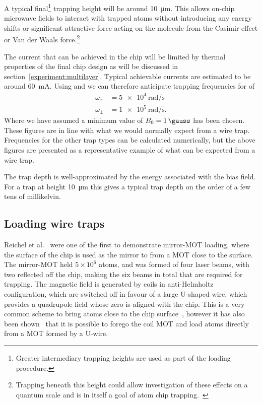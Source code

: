  A
typical final\footnote{Greater intermediary trapping heights are used as part of
the loading procedure.} trapping height will be around \SI{10}{\micro\metre}.
This allows on-chip microwave fields to interact with trapped atoms without
introducing any energy shifts   or significant attractive force acting on the
molecule from the Casimir effect or Van der Waals force.\footnote{Trapping
beneath this height could allow investigation of these effects on a quantum
scale and is in itself a goal of atom chip
trapping.~\cite{PhysRevA.56.R3350}}~\cite{2011Ac}

The current that can be achieved in the chip will be limited by thermal
properties of the final chip design as will be discussed in
section~\ref{experiment:multilayer}. Typical achievable currents are estimated
to be around \SI{60}{\milli\ampere}. 
Using  and
 we can therefore anticipate trapping frequencies
for \CaF{} of
%
\begin{align}
  \omega_x &= \SI{5e4}{\radian \per \second} \\
  \omega_\perp &= \SI{1e5}{\radian \per \second}.
\end{align}
%
Where we have assumed a minimum value of $B_0 = \SI{1}{\gauss}$ has been chosen.
These figures are in line with what we would normally expect from a wire
trap.~\cite{2011Ac}
Frequencies for the other trap types can be calculated numerically, but the
above figures are presented as a representative example of what can be expected
from a wire trap.

The trap depth is well-approximated by the energy associated with the bias
field. For a trap at height \SI{10}{\micro\metre} this gives a typical trap
depth on the order of a few tens of millikelvin.~\cite{2011Ac}

\subsection{Loading wire traps}

Reichel et al.~\cite{Reichel1999} were one of the first to demonstrate
mirror-MOT loading, where the surface of the chip is used as the mirror to from
a MOT close to the surface. The mirror-MOT held $5\times10^6$ \esRb{} atoms,
and was formed of four laser beams, with two reflected off the chip, making the
six beams in total that are required for trapping. The magnetic field is
generated by coils in anti-Helmholtz configuration, which are switched off in
favour of a large U-shaped wire, which provides a quadrupole field whose zero is
aligned with the chip. This is a very common scheme to bring atoms close to the
chip surface~\cite{Folman2000, PhysRevLett.97.200405, 2011Ac, Boehi2009},
however it has also been shown~\cite{0256-307X-25-9-034} that it is possible to
forego the coil MOT and load atoms directly from a MOT formed by a U-wire.

